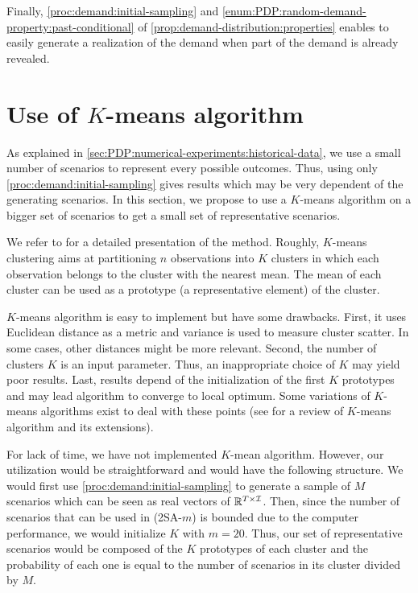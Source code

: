 Finally, \cref{proc:demand:initial-sampling} and \cref{enum:PDP:random-demand-property:past-conditional} of \cref{prop:demand-distribution:properties} enables to easily generate a realization of the demand when part of the demand is already revealed.



\section{Use of $K$-means algorithm}
\label{sec:PDP:numerical-experiments:k-means}


As explained in \cref{sec:PDP:numerical-experiments:historical-data}, we use a small number of scenarios to represent every possible outcomes.
Thus, using only \cref{proc:demand:initial-sampling} gives results which may be very dependent of the generating scenarios.
In this section, we propose to use a $K$-means algorithm on a bigger set of scenarios to get a small set of representative scenarios.


We refer to \citet[Chapter 14]{Hastie2009} for a detailed presentation of the method.
Roughly, $K$-means clustering aims at partitioning $n$ observations into $K$ clusters in which each observation belongs to the cluster with the nearest mean.
The mean of each cluster can be used as a prototype (\ie a representative element) of the cluster.


$K$-means algorithm is easy to implement but have some drawbacks.
First, it uses Euclidean distance as a metric and variance is used to measure cluster scatter.
In some cases, other distances might be more relevant.
Second, the number of clusters $K$ is an input parameter.
Thus, an inappropriate choice of $K$ may yield poor results.
Last, results depend of the initialization of the first $K$ prototypes and may lead algorithm to converge to local optimum.
Some variations of $K$-means algorithms exist to deal with these points (see \citet{Jain2010} for a review of $K$-means algorithm and its extensions).


\medskip


For lack of time, we have not implemented $K$-mean algorithm.
However, our utilization would be straightforward and would have the following structure.
We would first use \cref{proc:demand:initial-sampling} to generate a sample of $M$ scenarios which can be seen as real vectors of $\mathbb{R}^{T\times\mathcal{I}}$.
Then, since the number of scenarios that can be used in (2SA-$m$) is bounded due to the computer performance, we would initialize $K$ with $m=20$.
Thus, our set of representative scenarios would be composed of the $K$ prototypes of each cluster and the probability of each one is equal to the number of scenarios in its cluster divided by $M$.



